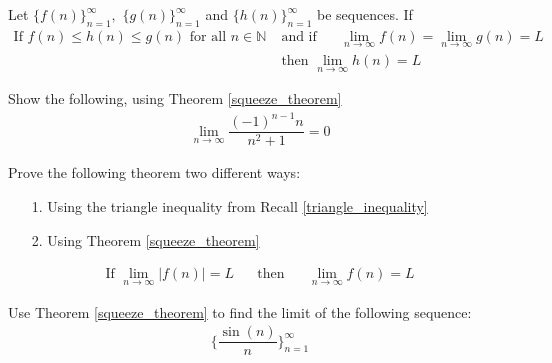 \begin{theorem}
Let $\{f(n)\}_{n=1}^{\infty}, \hspace{4pt} \{g(n)\}_{n=1}^{\infty}$ and $\{h(n)\}_{n=1}^{\infty}$ be sequences. If
\begin{align*}
    \text{If} \hspace{4pt} f(n)\leq h(n)\leq g(n) \hspace{4pt} \text{for all} \hspace{4pt} n \in \mathbb{N} \hspace{20pt}
    & \text{and if}  \hspace{20pt} \lim_{n \longrightarrow \infty} f(n) = \lim_{n \longrightarrow \infty} g(n) = L \\[2ex]
    & \text{then} \hspace{4pt} \lim_{n \longrightarrow \infty} h(n) = L 
\end{align*}
\label{squeeze_theorem}
\end{theorem}

\begin{exercise}
Show the following, using Theorem \ref{squeeze_theorem}
\begin{align*}
    \lim_{n \longrightarrow \infty} \dfrac{(-1)^{n-1}n}{n^{2}+1} = 0
\end{align*}
\end{exercise}

\begin{exercise}
Prove the following theorem two different ways:
\begin{itemize}
    \item [1.] Using the triangle inequality from Recall \ref{triangle_inequality}
    \item [2.] Using Theorem \ref{squeeze_theorem}
\end{itemize}
\begin{align*}
    \text{If} \hspace{4pt} \lim_{n \longrightarrow \infty} \lvert f(n) \rvert = L \hspace{20pt} \text{then} \hspace{20pt} \lim_{n \longrightarrow \infty} f(n) = L
\end{align*}
\end{exercise}

\begin{exercise}
Use Theorem \ref{squeeze_theorem} to find the limit of the following sequence:
\begin{align*}
    \Big\{\dfrac{\sin(n)}{n}\Big\}_{n=1}^{\infty}
\end{align*}
\end{exercise}


